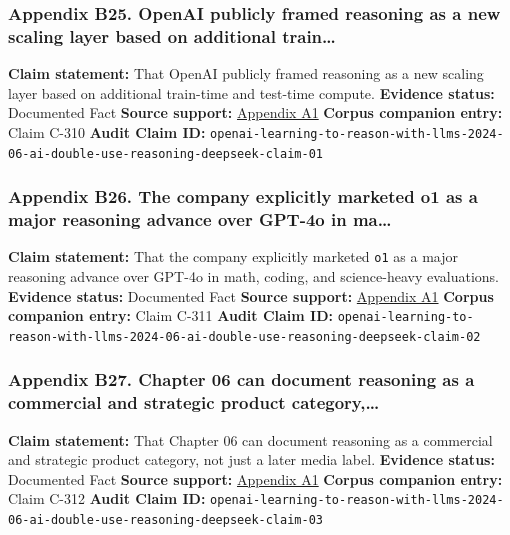 \documentclass[
  american,
  11pt,
  letterpaper,
]{article}
\begin{document}
\subsubsection{Appendix B25. OpenAI publicly framed reasoning as a new
scaling layer based on additional
train\ldots{}}\label{appendix-b25-openai-publicly-framed-reasoning-as-a-new-scaling-layer-based-on-additional-train}

\textbf{Claim statement:} That OpenAI publicly framed reasoning as a new
scaling layer based on additional train-time and test-time compute.
\textbf{Evidence status:} Documented Fact \textbf{Source support:}
\hyperref[appendix-a1-learning-to-reason-with-llms]{Appendix A1}
\textbf{Corpus companion entry:} Claim C-310 \textbf{Audit Claim ID:}
\texttt{openai-learning-to-reason-with-llms-2024-06-ai-double-use-reasoning-deepseek-claim-01}

\subsubsection{Appendix B26. The company explicitly marketed o1 as a
major reasoning advance over GPT-4o in
ma\ldots{}}\label{appendix-b26-the-company-explicitly-marketed-o1-as-a-major-reasoning-advance-over-gpt-4o-in-ma}

\textbf{Claim statement:} That the company explicitly marketed
\texttt{o1} as a major reasoning advance over GPT-4o in math, coding,
and science-heavy evaluations. \textbf{Evidence status:} Documented Fact
\textbf{Source support:}
\hyperref[appendix-a1-learning-to-reason-with-llms]{Appendix A1}
\textbf{Corpus companion entry:} Claim C-311 \textbf{Audit Claim ID:}
\texttt{openai-learning-to-reason-with-llms-2024-06-ai-double-use-reasoning-deepseek-claim-02}

\subsubsection{Appendix B27. Chapter 06 can document reasoning as a
commercial and strategic product
category,\ldots{}}\label{appendix-b27-chapter-06-can-document-reasoning-as-a-commercial-and-strategic-product-category}

\textbf{Claim statement:} That Chapter 06 can document reasoning as a
commercial and strategic product category, not just a later media label.
\textbf{Evidence status:} Documented Fact \textbf{Source support:}
\hyperref[appendix-a1-learning-to-reason-with-llms]{Appendix A1}
\textbf{Corpus companion entry:} Claim C-312 \textbf{Audit Claim ID:}
\texttt{openai-learning-to-reason-with-llms-2024-06-ai-double-use-reasoning-deepseek-claim-03}
\end{document}
